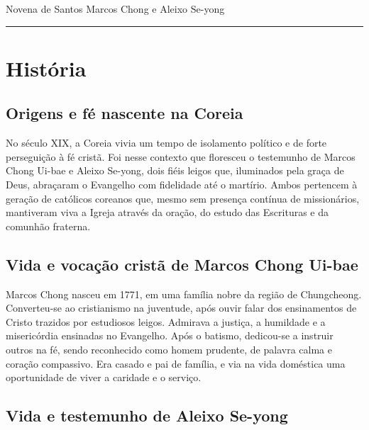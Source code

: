 \documentclass[a4paper,14pt]{extarticle} \usepackage[utf8]{inputenc}
\begin{document}


\begin{center}
  {\huge Novena de Santos Marcos Chong e Aleixo Se-yong}
\end{center}



\noindent\rule{\textwidth}{0.4pt}

\tableofcontents

\thispagestyle{empty}


\newpage

\section{História}


\subsection{Origens e fé nascente na Coreia}

 No século XIX, a Coreia vivia um tempo de isolamento político e de forte perseguição à fé cristã. Foi nesse contexto que floresceu o testemunho de Marcos Chong Ui-bae e Aleixo Se-yong, dois fiéis leigos que, iluminados pela graça de Deus, abraçaram o Evangelho com fidelidade até o martírio. Ambos pertencem à geração de católicos coreanos que, mesmo sem presença contínua de missionários, mantiveram viva a Igreja através da oração, do estudo das Escrituras e da comunhão fraterna.

\subsection{Vida e vocação cristã de Marcos Chong Ui-bae}

 Marcos Chong nasceu em 1771, em uma família nobre da região de Chungcheong. Converteu-se ao cristianismo na juventude, após ouvir falar dos ensinamentos de Cristo trazidos por estudiosos leigos. Admirava a justiça, a humildade e a misericórdia ensinadas no Evangelho. Após o batismo, dedicou-se a instruir outros na fé, sendo reconhecido como homem prudente, de palavra calma e coração compassivo. Era casado e pai de família, e via na vida doméstica uma oportunidade de viver a caridade e o serviço.

 \subsection{Vida e testemunho de Aleixo Se-yong}
\end{document}
